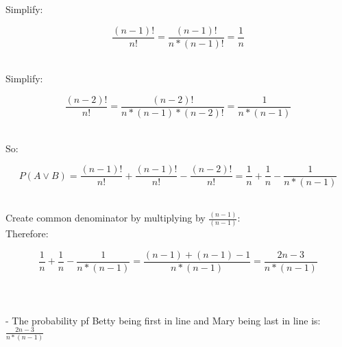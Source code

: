 \documentclass{amsart}
\theoremstyle{definition}
\theoremstyle{Exercise}
\theoremstyle{remark}
\theoremstyle{rule}
\numberwithin{equation}{section}
\begin{document}
  \begin{center}
  Simplify:
  \end{center}
  $$\frac{(n-1)!}{n!} = \frac{(n-1)!}{n*(n-1)!} = \frac{1}{n}$$\\
  \begin{center}
  Simplify:
  \end{center}
  $$\frac{(n-2)!}{n!} = \frac{(n-2)!}{n*(n-1)*(n-2)!} = \frac{1}{n*(n-1)}$$\\
  \begin{center}
  So:
  \end{center}
  $$P(A \lor B) = \frac{(n-1)!}{n!} + \frac{(n-1)!}{n!} - \frac{(n-2)!}{n!} = \frac{1}{n} + \frac{1}{n} - \frac{1}{n*(n-1)}$$\\
  \begin{center}
  Create common denominator by multiplying by $\frac{(n-1)}{(n-1)}$:\\
  Therefore:
  \end{center}
  $$\frac{1}{n} + \frac{1}{n} - \frac{1}{n*(n-1)} = \frac{(n-1)+(n-1)-1}{n*(n-1)} = \frac{2n-3}{n*(n-1)}$$\\
  \\\\
  - The probability pf Betty being first in line and Mary being last in line is: $\frac{2n-3}{n*(n-1)}$
  \newpage
  \section*{}
  \section*{}
\end{document}
